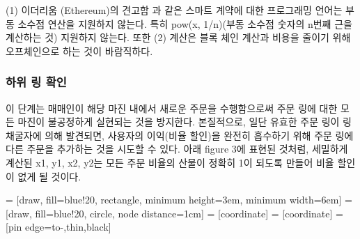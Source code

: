 \documentclass{article}
\makeatletter
\newenvironment{figurehere}
{\def\@captype{figure}}
{}
\makeatother
\begin{document}
\begin{multicols}{2}
(1) 이더리움 (Ethereum)의 견고함 \cite{dannen2017introducing}과 같은 스마트 계약에 대한 프로그래밍 언어는 부동 소수점 연산을 지원하지 않는다. 특히 pow(x, 1/n)(부동 소수점 숫자의 n번째 근을 계산하는 것) 지원하지 않는다. 또한 (2) 계산은 블록 체인 계산과 비용을 줄이기 위해 오프체인으로 하는 것이 바람직하다.

\subsubsection{하위 링 확인\label{sec:sub_ring_check}}
이 단계는 매매인이 해당 마진 내에서 새로운 주문을 수행함으로써 주문 링에 대한 모든 마진이 불공정하게 실현되는 것을 방지한다. 본질적으로, 일단 유효한 주문 링이 링 채굴자에 의해 발견되면, 사용자의 이익(비율 할인)을 완전히 흡수하기 위해 주문 링에 다른 주문을 추가하는 것을 시도할 수 있다. 아래 figure 3에 표현된 것처럼, 세밀하게 계산된 x1, y1, x2, y2는 모든 주문 비율의 산물이 정확히 1이 되도록 만들어 비율 할인이 없게 될 것이다.

\begin{center}
	\begin{figurehere}
		\centering
		 = [draw, fill=blue!20, rectangle, 
		minimum height=3em, minimum width=6em]
		 = [draw, fill=blue!20, circle, node distance=1cm]
		 = [coordinate]
		 = [coordinate]
		 = [pin edge={to-,thin,black}]
		
\end{figurehere}
\end{center}
\end{multicols}
\end{document}
